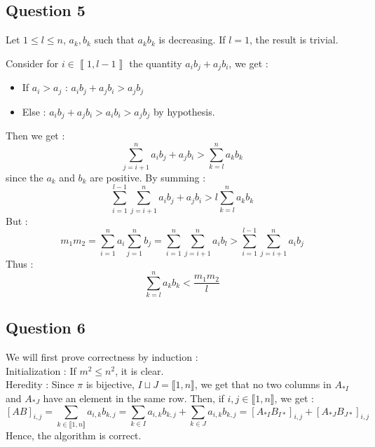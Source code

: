 \documentclass{cours}
\begin{document}
        \subsection{Question 5}
            Let $1 \leq l \leq n$, $a_{k}, b_{k}$ such that $a_{k}b_{k}$ is decreasing.
            If $l = 1$, the result is trivial.

            Consider for $i \in \left\llbracket 1, l - 1\right\rrbracket$ the quantity $a_{i}b_{j} + a_{j}b_{i}$, we get :
            \begin{itemize}
                \item If $a_{i} > a_{j}$ : $a_{i}b_{j} + a_{j}b_{i} > a_{j}b_{j}$
                \item Else : $a_{i}b_{j} + a_{j}b_{i} > a_{i}b_{i} > a_{j}b_{j}$ by hypothesis.
            \end{itemize}

            Then we get :
            \[\sum_{j = i + 1}^{n} a_{i}b_{j} + a_{j}b_{i} > \sum_{k = l}^{n} a_{k}b_{k}\] since the $a_{k}$ and $b_{k}$ are positive.
            By summing :
            \[\sum_{i = 1}^{l -1}\sum_{j = i + 1}^{n} a_{i}b_{j} + a_{j}b_{i} > l\sum_{k = l}^{n} a_{k}b_{k}\]
            But :
            \[m_{1}m_{2} = \sum_{i = 1}^{n}a_{i} \sum_{j = 1}^{n}b_{j} = \sum_{i = 1}^{n}\sum_{j = i + 1}^{n}a_{i}b_{l} > \sum_{i = 1}^{l - 1}\sum_{j = i + 1}^{n}a_{i}b_{j}\]
            Thus :
            \[\sum_{k = l}^{n} a_{k}b_{k} < \frac{m_{1}m_{2}}{l}\]

        \subsection{Question 6}
        We will first prove correctness by induction : \\
        Initialization : If $m^{2} \leq n^{2}$, it is clear.\\
        Heredity : Since $\pi$ is bijective, $I\sqcup J = \llbracket 1, n \rrbracket$, we get that no two columns in $A_{*I}$ and $A_{*J}$ have an element in the same row. Then, if $i, j \in \llbracket 1, n \rrbracket$, we get :
        \[
            \left[AB\right]_{i, j} = \sum_{k\in \llbracket 1, n\rrbracket} a_{i, k}b_{k, j} = \sum_{k\in I}a_{i, k}b_{k,j} + \sum_{k \in J}a_{i,k}b_{k,j} = \left[A_{*I}B_{I*}\right]_{i, j} + \left[A_{*J}B_{J*}\right]_{i, j}
        \]
        Hence, the algorithm is correct.
\end{document}
